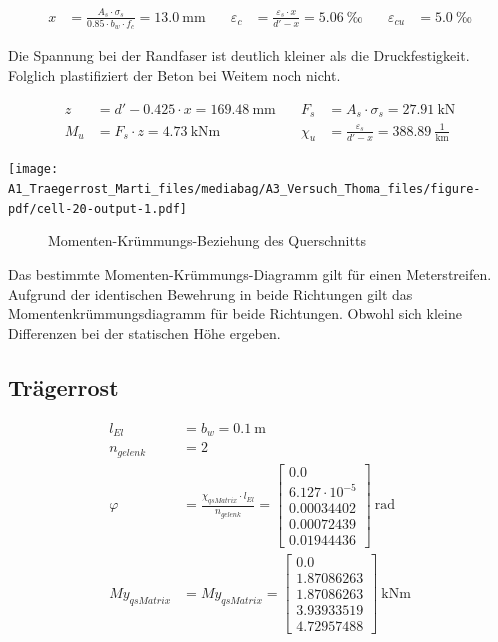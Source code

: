 \documentclass[
  11pt,
  letterpaper,
]{scrreprt}
\begin{document}
\[
\begin{aligned}
x& = \frac{A_{s} \cdot \sigma_{s}}{0.85 \cdot b_{w} \cdot f_{c}} = 13.0 \ \mathrm{mm} \quad & \varepsilon_{c}& = \frac{\varepsilon_{s} \cdot x}{{d}' - x} = 5.06 \ \mathrm{‰} \quad & \varepsilon_{cu}& = 5.0 \ \mathrm{‰} \end{aligned}
\]

Die Spannung bei der Randfaser ist deutlich kleiner als die
Druckfestigkeit. Folglich plastifiziert der Beton bei Weitem noch nicht.

\[
\begin{aligned}
z& = {d}' - 0.425 \cdot x = 169.48 \ \mathrm{mm} \quad & F_{s}& = A_{s} \cdot \sigma_{s} = 27.91 \ \mathrm{kN} \\ 
M_{u}& = F_{s} \cdot z = 4.73 \ \mathrm{kNm} \quad & \chi_{u}& = \frac{\varepsilon_{s}}{{d}' - x} = 388.89 \ \frac{1}{\mathrm{km}} \end{aligned}
\]

\texttt{[image: A1\_Traegerrost\_Marti\_files/mediabag/A3\_Versuch\_Thoma\_files/figure-pdf/cell-20-output-1.pdf]}

\begin{figure}[H]


\caption{\label{fig-tho_M_chi}Momenten-Krümmungs-Beziehung des
Querschnitts}

\end{figure}%

Das bestimmte Momenten-Krümmungs-Diagramm gilt für einen Meterstreifen.
Aufgrund der identischen Bewehrung in beide Richtungen gilt das
Momentenkrümmungsdiagramm für beide Richtungen. Obwohl sich kleine
Differenzen bei der statischen Höhe ergeben.

\subsection{Trägerrost}\label{truxe4gerrost}

\[
\begin{aligned}
l_{El}& = b_{w} = 0.1 \ \mathrm{m} \\ 
n_{gelenk}& = 2 \\ 
\varphi& = \frac{\chi_{qs Matrix} \cdot l_{El}}{n_{gelenk}} = \left[\begin{matrix}0.0\\6.127 \cdot 10^{-5}\\0.00034402\\0.00072439\\0.01944436\end{matrix}\right] \ \mathrm{rad} \\ 
My_{qs Matrix}& = My_{qs Matrix} = \left[\begin{matrix}0.0\\1.87086263\\1.87086263\\3.93933519\\4.72957488\end{matrix}\right] \ \mathrm{kNm} \end{aligned}
\]
\end{document}
